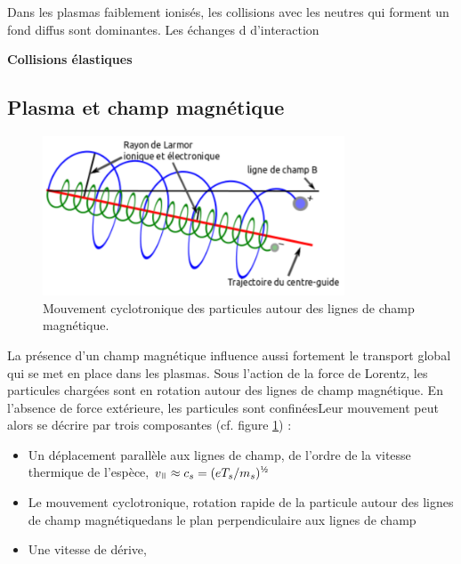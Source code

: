 Dans les plasmas faiblement ionisés, les collisions avec les neutres
qui forment un fond diffus sont dominantes. Les échanges d
d'interaction

\textbf{Collisions élastiques}

\subsection{Plasma et champ magnétique}
%
\begin{figure}
\centering
\includegraphics[width=0.8\textwidth]{figures/mouvementCyclotron.png}
{\caption{Mouvement cyclotronique des particules autour des lignes de champ
magnétique.}\label{1-particleDrifts}}
\end{figure}
La présence d'un champ magnétique influence aussi fortement le transport global qui
se met en place dans les plasmas. Sous l'action de la force de Lorentz, les particules
chargées sont en rotation autour des lignes de champ magnétique. En l'absence de force
extérieure, les particules sont confinéesLeur mouvement peut alors
se décrire par trois composantes (cf. figure \ref{1-particleDrifts}) :
\begin{itemize}
  \item Un déplacement parallèle aux lignes de champ, de l'ordre de la vitesse
  thermique de l'espèce, $v_\para\approx c_s=(eT_s/m_s)^{\text{\textonehalf}}$
  \item Le mouvement cyclotronique, rotation rapide de la particule
  autour des lignes de champ magnétiquedans le plan perpendiculaire aux lignes
  de champ
  \item Une vitesse de dérive,
\end{itemize}

